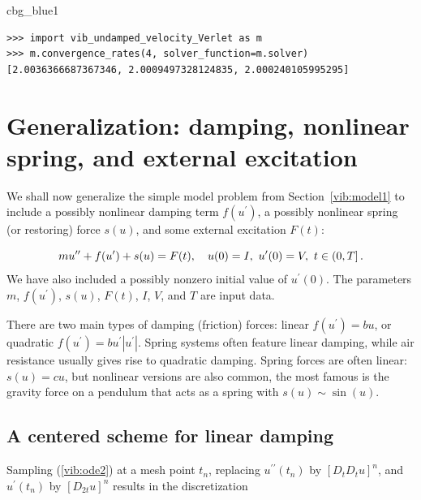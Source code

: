 \documentclass[%
oneside,                 %
final,                   %
10pt]{article}
\newenvironment{_cod_tight}[1]{
   \def\FrameCommand{\colorbox{#1}}
   \FrameRule0.6pt\MakeFramed {\FrameRestore}\vskip3mm}
   {\vskip0mm\endMakeFramed}
\newenvironment{cod}[1]{
\bgroup\rmfamily
\fboxsep=0mm\relax
\begin{_cod_tight}{#1}
\list{}{\parsep=-2mm\parskip=0mm\topsep=0pt\leftmargin=2mm
\rightmargin=2\leftmargin\leftmargin=4pt\relax}
\item\relax}
{\endlist\end{_cod_tight}\egroup}
\begin{document}
\begin{cod}{cbg_blue1}\begin{Verbatim}[numbers=none,fontsize=\fontsize{9pt}{9pt},baselinestretch=0.95,xleftmargin=2mm]
>>> import vib_undamped_velocity_Verlet as m
>>> m.convergence_rates(4, solver_function=m.solver)
[2.0036366687367346, 2.0009497328124835, 2.000240105995295]
\end{Verbatim}
\end{cod}
\noindent

\section{Generalization: damping, nonlinear spring, and external excitation}
\label{vib:model2}


We shall now generalize the simple model problem from
Section~\ref{vib:model1} to include a possibly nonlinear damping term $f(u^{\prime})$,
a possibly nonlinear spring (or restoring) force $s(u)$, and
some external excitation $F(t)$:

\begin{equation}
mu^{\prime\prime} + f(u^{\prime}) + s(u) = F(t),\quad u(0)=I,\ u^{\prime}(0)=V,\ t\in (0,T]
\tp
\label{vib:ode2}
\end{equation}
We have also included a possibly nonzero initial value of $u^{\prime}(0)$.
The parameters $m$, $f(u^{\prime})$, $s(u)$, $F(t)$, $I$, $V$, and $T$ are
input data.

There are two main types of damping (friction) forces: linear $f(u^{\prime})=bu$, or
quadratic $f(u^{\prime})=bu^{\prime}|u^{\prime}|$. Spring systems often feature linear
damping, while air resistance usually gives rise to quadratic damping.
Spring forces are often linear: $s(u)=cu$, but nonlinear versions
are also common, the most famous is the gravity force on a pendulum
that acts as a spring with $s(u)\sim \sin(u)$.


\subsection{A centered scheme for linear damping}
\label{vib:ode2:fdm:flin}

Sampling (\ref{vib:ode2}) at a mesh point $t_n$, replacing
$u^{\prime\prime}(t_n)$ by $[D_tD_tu]^n$, and $u^{\prime}(t_n)$ by $[D_{2t}u]^n$ results
in the discretization
\end{document}
